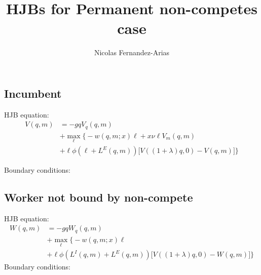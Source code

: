 \documentclass[12pt,english]{article}
\theoremstyle{remark}
\begin{document}
\title{HJBs for Permanent non-competes case}
\author{Nicolas Fernandez-Arias}
\maketitle

\subsection*{Incumbent}
HJB equation: 
\begin{align*}
V(q,m) &= -gqV_q(q,m) \\
	   &+ \max_{\ell} \big\{ -w(q,m;x) \ell + x\nu \ell V_m (q,m)  \\ 
	   &+ \ell \phi (\ell + L^E(q,m))\big[V((1+\lambda)q,0)-V(q,m)\big] \big\} 
\end{align*}

Boundary conditions: 


\subsection*{Worker not bound by non-compete}
HJB equation:
\begin{align*}
W(q,m) &= -gqW_q(q,m) \\
	   &+ \max_{\ell} \big\{-w(q,m;x)\ell \\
	   &+ \ell \phi (L^I(q,m) + L^E(q,m)) \big[ V((1+\lambda)q,0)-W(q,m) \big]\big\}
\end{align*}
Boundary conditions: 
\end{document}
